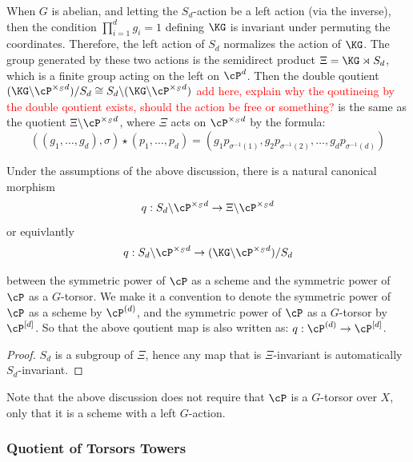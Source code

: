 When $G$ is abelian, and letting the $S_d$-action be a left action (via the inverse), then
the condition  $\prod_{i=1}^d g_i = 1$ defining $\KG$ is invariant under permuting the coordinates.
Therefore, the left action of $S_d$ normalizes the action of $\KG$.
The group generated by these two actions is the semidirect product $\Xi = \KG \rtimes S_d$,
which is a finite group acting on the left on $\cP^d$.
Then the double qoutient $(\KG \backslash \cP^{\times_S d}) / S_d \cong S_d \backslash (\KG \backslash \cP^{\times_S d})$
\textcolor{red}{add here, explain why the qoutineing by the double qoutient exists, should the action be free or something?}
is the same as the quotient $\Xi \backslash \cP^{\times_S d}$, where
$\Xi$ acts on $\cP^{\times_S d}$ by the formula:
$$((g_1, \dots, g_d), \sigma) \star (p_1, \dots, p_d) = (g_1 p_{\sigma^{-1}(1)}, g_2 p_{\sigma^{-1}(2)}, \dots, g_d p_{\sigma^{-1}(d)})$$


\begin{cor}\label{cor:sym-power-quotient}
    Under the assumptions of the above discussion, there is a natural canonical morphism 
    $$q: S_d \backslash \cP^{\times_S d} \to \Xi \backslash \cP^{\times_S d}$$
    or equivlantly
    $$ q: S_d \backslash \cP^{\times_S d} \to (\KG \backslash \cP^{\times_S d}) / S_d$$

    between the symmetric power of $\cP$ as a scheme and the symmetric power of $\cP$ as a $G$-torsor.
    We make it a convention to denote the symmetric power of $\cP$ as a scheme by 
    $\cP^{(d)}$, and the symmetric power of $\cP$ as a $G$-torsor by $\cP^{[d]}$. 
    So that the above qoutient map is also written as:
    $q: \cP^{(d)} \to \cP^{[d]}$.
\end{cor}

\begin{proof}
    $S_d$ is a subgroup of $\Xi$,
    hence any map that is $\Xi$-invariant is automatically $S_d$-invariant.
\end{proof}

\begin{rem*}
    Note that the above discussion does not require that $\cP$ is a $G$-torsor over $X$, only that it is a scheme
    with a left $G$-action.
\end{rem*}



%
%
\subsubsection*{Quotient of Torsors Towers}
\label{subsection:quotient_torsors_towers}

